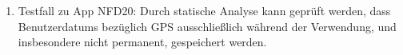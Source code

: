 \begin{enumerate}[label=\textbf{/T\arabic*0/}, align=left]
	\item Testfall zu App NFD20: Durch \gls{statische Analyse} kann geprüft werden, dass \Glspl{Benutzerdatum} bezüglich \Gls{GPS} ausschließlich während der Verwendung, und insbesondere nicht permanent, gespeichert werden.
\end{enumerate}